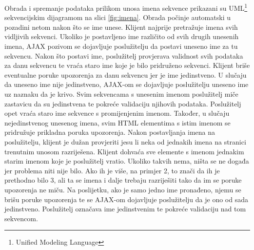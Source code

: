 Obrada i spremanje podataka prilikom unosa imena sekvence prikazani su
UML\footnote{Unified Modeling Language} sekvencijskim dijagramom na slici
\ref{fig:imena}. Obrada počinje automatski u pozadini netom nakon što se ime
unese. Klijent najprije pretražuje imena svih vidljivih sekvenci. Ukoliko je
postavljeno ime različito od svih drugih unesenih imena, AJAX pozivom se
dojavljuje poslužitelju da postavi uneseno ime za tu sekvencu. Nakon što postavi
ime, poslužitelj provjerava validnost svih podataka za danu sekvencu te vraća
staro ime koje je bilo pridruženo sekvenci. Klijent briše eventualne poruke
upozorenja za danu sekvencu jer je ime jedinstveno. U slučaju da uneseno ime
nije jedinstveno, AJAX-om se dojavljuje poslužitelju uneseno ime uz naznaku da
je krivo. Svim sekvencama s unesenim imenom poslužitelj miče zastavicu da su
jedinstvena te pokreće validaciju njihovih podataka. Poslužitelj opet vraća staro
ime sekvence s promijenjenim imenom. Također, u slučaju nejedinstvenog unesenog
imena, svim HTML elementima s istim imenom se pridružuje prikladna poruka
upozorenja. Nakon postavljanja imena na poslužitelju, klijent je dužan
provjeriti jesu li neka od jednakih imena na stranici trenutnim unosom
razriješena. Klijent dohvaća sve elemente s imenom jednakim starim imenom koje
je poslužitelj vratio. Ukoliko takvih nema, ništa se ne događa jer problema niti
nije bilo. Ako ih je više, na primjer 2, to znači da ih je prethodno bilo 3, ali
ta se imena i dalje trebaju razriješiti tako da im se poruke upozorenja ne miču.
Na poslijetku, ako je samo jedno ime pronađeno, njemu se brišu poruke upozorenja
te se AJAX-om dojavljuje poslužitelju da je ono od sada jedinstveno. Poslužitelj
označava ime jedinstvenim te pokreće validaciju nad tom sekvencom.

